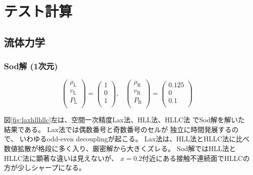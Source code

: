 \chapter{テスト計算}\label{chap:test}

\section{流体力学}

\clearpage
\subsection{Sod解 (1次元)}

\begin{equation}
\left(
\begin{array}{c}
\rho_\mathrm{L} \\
v_\mathrm{L} \\
P_\mathrm{L} \\
\end{array}
\right)
= 
\left(
\begin{array}{c}
1 \\
0 \\
1 \\
\end{array}
\right),\;\;\;
\left(
\begin{array}{c}
\rho_\mathrm{R} \\
v_\mathrm{R} \\
P_\mathrm{R} \\
\end{array}
\right)
= 
\left(
\begin{array}{c}
0.125 \\
0 \\
0.1 \\
\end{array}
\right)
\end{equation}

図\ref{fig:laxhllhllc}左は、空間一次精度Lax法、HLL法、HLLC法
でSod解を解いた結果である。
Lax法では偶数番号と奇数番号のセルが
独立に時間発展するので、
いわゆるodd-even decouplingが起こる。
Lax法は、HLL法とHLLC法に比べ数値拡散が格段に多く入り、厳密解から大きくズレる。
Sod解ではHLL法とHLLC法に顕著な違いは見えないが、
$x=0.2$付近にある接触不連続面でHLLCの方が少しシャープになる。

